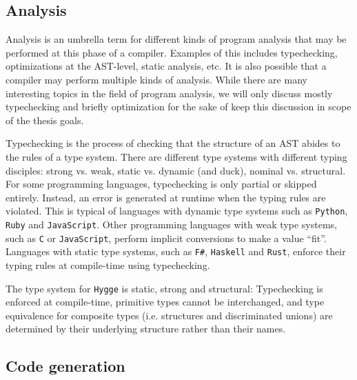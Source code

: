 \subsection{Analysis}

Analysis is an umbrella term for different kinds of program analysis that may be performed at this phase of a compiler. Examples of this includes typechecking, optimizations at the AST-level,
static analysis, etc. It is also possible that a compiler may perform multiple kinds of analysis. While there are many interesting topics in the field of program analysis,
we will only discuss mostly typechecking and briefly optimization for the sake of keep this discussion in scope of the thesis goals.

Typechecking is the process of checking that the structure of an AST abides to the rules of a type system. There are different type systems with different typing disciples:
strong vs. weak, static vs. dynamic (and duck), nominal vs. structural. For some programming languages, typechecking is only partial or skipped entirely. Instead,
an error is generated at runtime when the typing rules are violated. This is typical of languages with dynamic type systems such as \texttt{Python}, \texttt{Ruby} and
\texttt{JavaScript}. Other programming languages with weak type systems, such as \texttt{C} or \texttt{JavaScript}, perform implicit conversions to make a value ``fit''.
Languages with static type systems, such as \texttt{F\#}, \texttt{Haskell} and \texttt{Rust}, enforce their typing rules at compile-time using typechecking.

The type system for \texttt{Hygge} is static, strong and structural: Typechecking is enforced at compile-time, primitive types cannot be interchanged, and type
equivalence for composite types (i.e. structures and discriminated unions) are determined by their underlying structure rather than their names. 

\subsection{Code generation}

